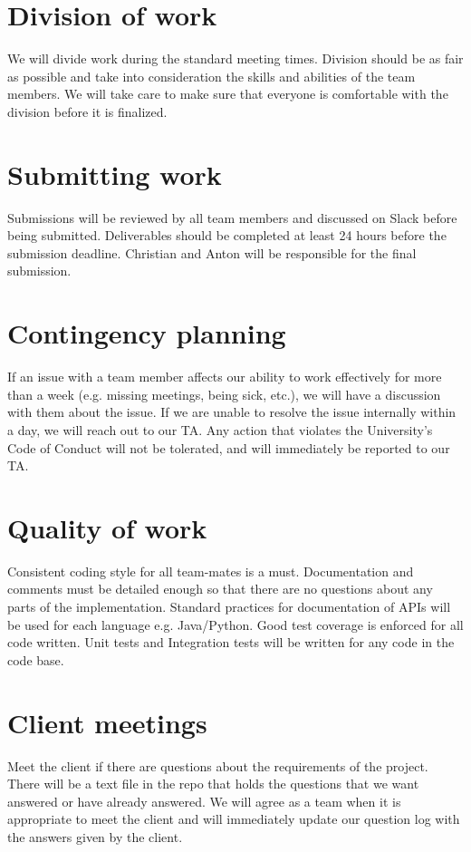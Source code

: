 \documentclass[12pt]{scrartcl}
\begin{document}
\section{Division of work}
We will divide work during the standard meeting times. Division should be as fair as possible and take into consideration the skills and abilities of the team members. We will take care to make sure that everyone is comfortable with the division before it is finalized.

\section{Submitting work}
Submissions will be reviewed by all team members and discussed on Slack before being submitted. Deliverables should be completed at least 24 hours before the submission deadline. Christian and Anton will be responsible for the final submission.

\section{Contingency planning}
If an issue with a team member affects our ability to work effectively for more than a week (e.g. missing meetings, being sick, etc.), we will have a discussion with them about the issue. If we are unable to resolve the issue internally within a day, we will reach out to our TA. Any action that violates the University's Code of Conduct will not be tolerated, and will immediately be reported to our TA.

\section{Quality of work}
Consistent coding style for all team-mates is a must. Documentation and comments must be detailed enough so that there are no questions about any parts of the implementation. Standard practices for documentation of APIs will be used for each language e.g. Java/Python. Good test coverage is enforced for all code written. Unit tests and Integration tests will be written for any code in the code base.

\section{Client meetings}
Meet the client if there are questions about the requirements of the project. There will be a text file in the repo that holds the questions that we want answered or have already answered. We will agree as a team when it is appropriate to meet the client and will immediately update our question log with the answers given by the client.
\end{document}
